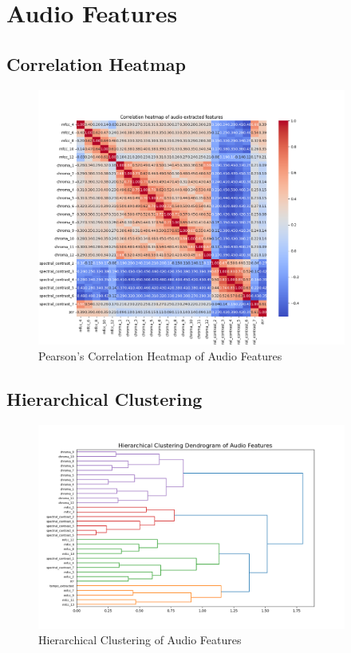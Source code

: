 \section{Audio Features}

\subsection*{Correlation Heatmap}
\label{sec:correlationheatmapsspotifyfeatures}

\begin{center}
\begin{figure}[H]
  \centering
  \includegraphics[width=4in]{img/corr_heatmap_audio.png}
  \caption{Pearson's Correlation Heatmap of Audio Features}
  \label{Figure:fig_beh}
\end{figure}
\end{center}

\subsection*{Hierarchical Clustering}
\label{sec:hierarchicalclustering}

\begin{center}
\begin{figure}[H]
  \centering
  \includegraphics[width=4in]{img/dendrogram_audio.png}
  \caption{Hierarchical Clustering of Audio Features}
  \label{Figure:dendrogram_spotify_features}
\end{figure}
\end{center}


